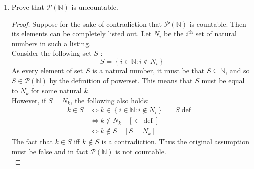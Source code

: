 \documentclass[10pt]{article}
\begin{document}
\begin{enumerate}[label={}]
      \item Prove that $\mathcal{P}(\mathbb{N})$ is uncountable.
            \begin{proof}
                  Suppose for the sake of contradiction that $\mathcal{P}(\mathbb{N})$ is countable. Then its elements can be completely listed out. Let $N_i$ be the $i^{\text {th}}$ set of natural numbers in such a listing.\\
                  Consider the following set $S$ :
                  $$
                        S=\left\{i \in \mathbb{N}: i \notin N_i\right\}
                  $$
                  As every element of set $S$ is a natural number, it must be that $S \subseteq \mathbb{\mathbb{N}}$, and so $S \in \mathcal{P}(\mathbb{N})$ by the definition of powerset. This means that $S$ must be equal to $N_k$ for some natural $k$.\\
                  However, if $S=N_k$, the following also holds:
                  $$
                        \begin{aligned}
                              k \in S & \Leftrightarrow k \in\left\{i \in \mathbb{N}: i \notin N_i\right\} \quad[S \operatorname{def}] \\
                                      & \Leftrightarrow k \notin N_k \quad[\in \operatorname{def}]                                     \\
                                      & \Leftrightarrow k \notin S \quad\left[S=N_k\right]
                        \end{aligned}
                  $$
                  The fact that $k \in S$ iff $k \notin S$ is a contradiction. Thus the original assumption must be false and in fact $\mathcal{P}(\mathbb{\mathbb{N}})$ is not countable.\\
            \end{proof}


\end{enumerate}
\end{document}
